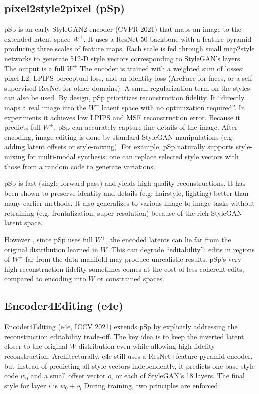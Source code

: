 \subsection{pixel2style2pixel (pSp)}
pSp is an early StyleGAN2 encoder (CVPR 2021) that maps an image to the extended latent space $W^+$. It uses a ResNet-50 backbone with a feature pyramid producing three scales of feature maps. Each scale is fed through small map2style networks to generate 512-D style vectors corresponding to StyleGAN's layers.
The output is a full $W^+$ The encoder is trained with a weighted sum of losses: pixel L2, LPIPS perceptual loss, and an identity loss (ArcFace for faces, or a self-supervised ResNet for other domains). 
A small regularization term on the styles can also be used.
By design, pSp prioritizes reconstruction fidelity. It “directly maps a real image into the $W^+$ latent space with no optimization required”. 
In experiments it achieves low LPIPS and MSE reconstruction error. 
Because it predicts full $W^+$, pSp can accurately capture fine details of the image. After encoding, image editing is done by standard StyleGAN manipulations (e.g. adding latent offsets or style-mixing). For example, pSp naturally supports style-mixing for multi-modal synthesis: one can replace selected style vectors with those from a random code to generate variations.

pSp is fast (single forward pass) and yields high-quality reconstructions. It has been shown to preserve identity and details (e.g. hairstyle, lighting) better than many earlier methods.
It also generalizes to various image-to-image tasks without retraining (e.g. frontalization, super-resolution) because of the rich StyleGAN latent space.

However , since  pSp uses full $W^+$,  the encoded latents can lie far from the original distribution learned in $W$. 
This can degrade “editability”: edits in regions of $W^+$ far from the data manifold may produce unrealistic results. 
pSp's very high reconstruction fidelity sometimes comes at the cost of less coherent edits, compared to encoding into $W$ or constrained spaces.
\citep{richardson2021encodingstylestyleganencoder}

\subsection{Encoder4Editing (e4e)}

Encoder4Editing (e4e, ICCV 2021) extends pSp by explicitly addressing the reconstruction editability trade-off. The key idea is to keep the inverted latent closer to the original $W$
distribution even while allowing high-fidelity reconstruction.  Architecturally, e4e still uses a ResNet+feature pyramid encoder, but instead of predicting all style vectors independently, it predicts one base style code $w_0$ and a small offset vector $o_i$ or each of StyleGAN's 18 layers.
The final style for layer $i$ is $w_0 + o_i$.During training, two principles are enforced: 

